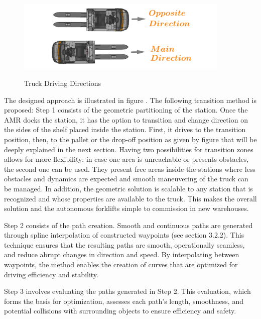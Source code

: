 \begin{figure}
    [!ht]
    \begin{center}
    \includegraphics[width=4in]{images/Chap2/driving_directions.png}\\
    \caption{Truck Driving Directions}
    \label{driving directions}
    \end{center}
\end{figure} 
 
The designed approach is illustrated in figure .
The following transition method is proposed: Step 1 consists of the geometric partitioning of the station.
Once the AMR docks the station, it has the option to transition and change 
direction on the sides of the shelf placed inside the station. First, it drives to the transition position, then, to the 
pallet or the drop-off position as given by figure  that will be deeply explained in the next section. 
Having two possibilities for transition zones allows 
for more flexibility: 
in case one area is unreachable or presents obstacles, the second one can be used. They present free areas 
inside the stations where less obstacles and dynamics are expected and smooth maneuvering of the truck can be managed. 
In addition, the geometric solution is scalable to 
any station that is recognized and whose properties are available to the truck. This makes the overall solution and the 
autonomous forklifts simple to
commission in new warehouses.

Step 2 consists of the path creation. Smooth and continuous paths are generated through spline interpolation of constructed waypoints (see section 3.2.2). 
This technique ensures 
that the resulting paths are smooth, operationally seamless, and reduce abrupt changes in direction and speed. 
By interpolating between waypoints, the method enables the creation of curves that are optimized for driving efficiency 
and stability.

Step 3 involves evaluating the paths generated in Step 2. This evaluation, which forms the basis for optimization, 
assesses each path's length, smoothness, and potential collisions with surrounding objects to ensure efficiency 
and safety.

